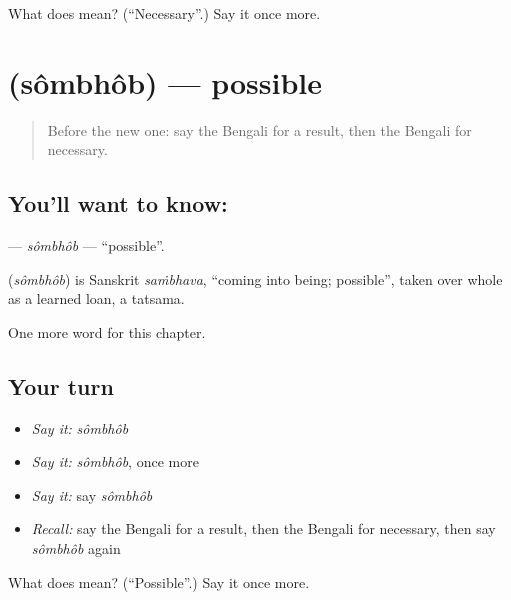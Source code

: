 \begin{tcolorbox}[breakable,colback=teal!4,colframe=teal!35!black,title={Before you move on}]
What does  mean? (\textquotedblleft{}Necessary\textquotedblright{}.) Say it once more.
\end{tcolorbox}
\section[\texorpdfstring{\bn{সম্ভব} (sômbhôb)}{সম্ভব (sômbhôb)}]{ (sômbhôb) — possible}

\label{lesson:BN-C191-sombhob}



\begin{quote}
Before the new one: say the Bengali for a result, then the Bengali for necessary.
\end{quote}

\subsection*{You'll want to know: }
\textbf{} — \emph{sômbhôb} — \textquotedblleft{}possible\textquotedblright{}.

\begin{cousinweb}
\textbf{} (\emph{sômbhôb}) is Sanskrit \emph{saṁbhava}, \textquotedblleft{}coming into being; possible\textquotedblright{}, taken over whole as a learned loan, a tatsama.
\end{cousinweb}

\begin{grammarlens}[title={What you've built}]
One more word for this chapter.
\end{grammarlens}

\subsection*{Your turn}
\begin{itemize}
\raggedright
  \item \emph{Say it:} \emph{sômbhôb}
  \item \emph{Say it:} \emph{sômbhôb}, once more
  \item \emph{Say it:} say \emph{sômbhôb}
  \item \emph{Recall:} say the Bengali for a result, then the Bengali for necessary, then say \emph{sômbhôb} again
\end{itemize}

\begin{tcolorbox}[breakable,colback=teal!4,colframe=teal!35!black,title={Before you move on}]
What does  mean? (\textquotedblleft{}Possible\textquotedblright{}.) Say it once more.
\end{tcolorbox}
